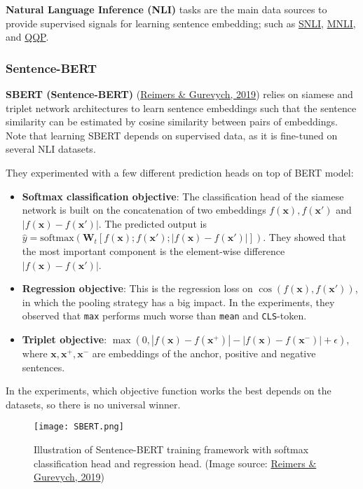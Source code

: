 \documentclass[12pt]{article}
\begin{document}
\textbf{Natural Language Inference (NLI)} tasks are the main data sources to provide supervised signals for learning sentence embedding; such as \href{https://nlp.stanford.edu/projects/snli/}{SNLI}, \href{https://cims.nyu.edu/~sbowman/multinli/}{MNLI}, and \href{https://www.kaggle.com/c/quora-question-pairs}{QQP}.

\subsubsection{Sentence-BERT}
\textbf{SBERT (Sentence-BERT)} (\href{https://arxiv.org/abs/1908.10084}{Reimers \& Gurevych, 2019}) relies on siamese and triplet network architectures to learn sentence embeddings such that the sentence similarity can be estimated by cosine similarity between pairs of embeddings. Note that learning SBERT depends on supervised data, as it is fine-tuned on several NLI datasets.

They experimented with a few different prediction heads on top of BERT model:
\begin{itemize}
    \item \textbf{Softmax classification objective}: The classification head of the siamese network is built on the concatenation of two embeddings $f(\mathbf{x}), f(\mathbf{x}')$ and $\vert f(\mathbf{x}) - f(\mathbf{x}') \vert$. The predicted output is $\hat{y}=\text{softmax}(\mathbf{W}_t [f(\mathbf{x}); f(\mathbf{x}'); \vert f(\mathbf{x}) - f(\mathbf{x}') \vert])$. They showed that the most important component is the element-wise difference $\vert f(\mathbf{x}) - f(\mathbf{x}') \vert$.
    \item \textbf{Regression objective}: This is the regression loss on $\cos(f(\mathbf{x}), f(\mathbf{x}'))$, in which the pooling strategy has a big impact. In the experiments, they observed that \texttt{max} performs much worse than \texttt{mean} and \texttt{CLS}-token.
    \item \textbf{Triplet objective}: $\max(0, |f(\mathbf{x}) - f(\mathbf{x}^+)|- |f(\mathbf{x}) - f(\mathbf{x}^-)| + \epsilon)$, where $\mathbf{x}, \mathbf{x}^+, \mathbf{x}^-$ are embeddings of the anchor, positive and negative sentences.
\end{itemize}
In the experiments, which objective function works the best depends on the datasets, so there is no universal winner.

\begin{figure}[H]
    \centering
    \texttt{[image: SBERT.png]}
    \caption{Illustration of Sentence-BERT training framework with softmax classification head and regression head. (Image source: \href{https://arxiv.org/abs/1908.10084}{Reimers \& Gurevych, 2019})}
\end{figure}
\end{document}
